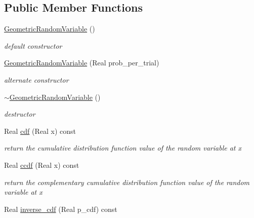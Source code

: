 \subsection*{Public Member Functions}
\begin{DoxyCompactItemize}
\item 
\hyperlink{classPecos_1_1GeometricRandomVariable_a9319591af249156d43e3dfd81d8f382e}{Geometric\+Random\+Variable} ()\label{classPecos_1_1GeometricRandomVariable_a9319591af249156d43e3dfd81d8f382e}

\begin{DoxyCompactList}\small\item\em default constructor \end{DoxyCompactList}\item 
\hyperlink{classPecos_1_1GeometricRandomVariable_aab7bb48d5a2f0c0f2ae862a52998d9f0}{Geometric\+Random\+Variable} (Real prob\+\_\+per\+\_\+trial)\label{classPecos_1_1GeometricRandomVariable_aab7bb48d5a2f0c0f2ae862a52998d9f0}

\begin{DoxyCompactList}\small\item\em alternate constructor \end{DoxyCompactList}\item 
\hyperlink{classPecos_1_1GeometricRandomVariable_a4ce2a22a345a42afe8a9a609bf10c1d5}{$\sim$\+Geometric\+Random\+Variable} ()\label{classPecos_1_1GeometricRandomVariable_a4ce2a22a345a42afe8a9a609bf10c1d5}

\begin{DoxyCompactList}\small\item\em destructor \end{DoxyCompactList}\item 
Real \hyperlink{classPecos_1_1GeometricRandomVariable_addd564e7f4f314e12d38df74d845f0d8}{cdf} (Real x) const \label{classPecos_1_1GeometricRandomVariable_addd564e7f4f314e12d38df74d845f0d8}

\begin{DoxyCompactList}\small\item\em return the cumulative distribution function value of the random variable at x \end{DoxyCompactList}\item 
Real \hyperlink{classPecos_1_1GeometricRandomVariable_a23c3b599e7e4788a9a5e9e93c3dbaf4d}{ccdf} (Real x) const \label{classPecos_1_1GeometricRandomVariable_a23c3b599e7e4788a9a5e9e93c3dbaf4d}

\begin{DoxyCompactList}\small\item\em return the complementary cumulative distribution function value of the random variable at x \end{DoxyCompactList}\item 
Real \hyperlink{classPecos_1_1GeometricRandomVariable_a918a1aac05ca349ea5313eebcba46c3e}{inverse\+\_\+cdf} (Real p\+\_\+cdf) const \label{classPecos_1_1GeometricRandomVariable_a918a1aac05ca349ea5313eebcba46c3e}


\end{DoxyCompactItemize}
